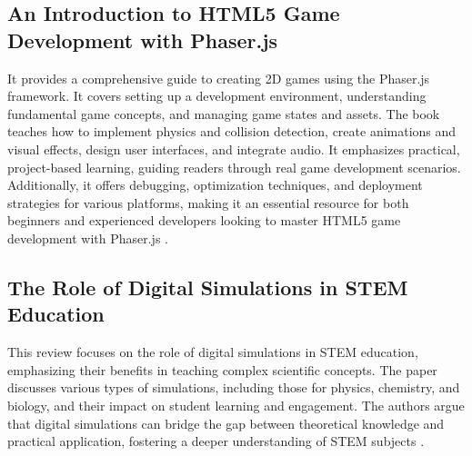 \subsection*{An Introduction to HTML5 Game Development with Phaser.js}
It provides a comprehensive guide to creating 2D games using the Phaser.js framework. It covers setting up a development environment, understanding fundamental game concepts, and managing game states and assets. The book teaches how to implement physics and collision detection, create animations and visual effects, design user interfaces, and integrate audio. It emphasizes practical, project-based learning, guiding readers through real game development scenarios. Additionally, it offers debugging, optimization techniques, and deployment strategies for various platforms, making it an essential resource for both beginners and experienced developers looking to master HTML5 game development with Phaser.js \cite{faas2017introduction}.

\subsection*{The Role of Digital Simulations in STEM Education}
This review focuses on the role of digital simulations in STEM education, emphasizing their benefits in teaching complex scientific concepts. The paper discusses various types of simulations, including those for physics, chemistry, and biology, and their impact on student learning and engagement. The authors argue that digital simulations can bridge the gap between theoretical knowledge and practical application, fostering a deeper understanding of STEM subjects \cite{smith2020digital}.

